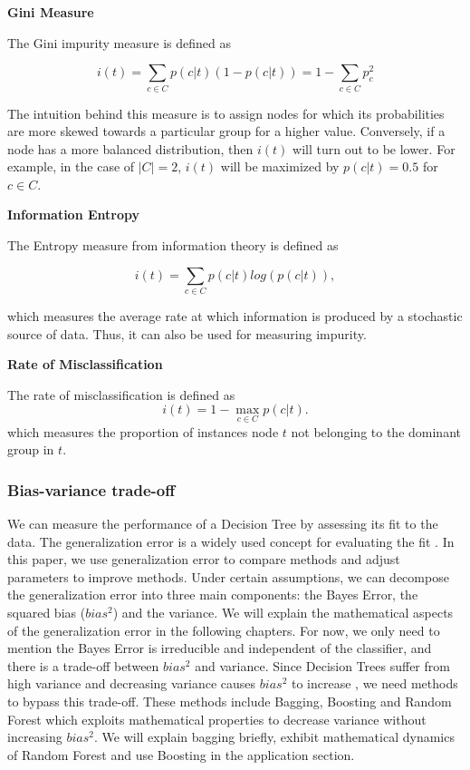 \textbf{Gini Measure}

The Gini impurity measure is defined as 

\begin{equation}
    i(t) = \sum_{c \in C} p(c|t) (1 - p(c|t)) = 1 - \sum_{c \in C} p_{c}^{2}
\end{equation}

The intuition behind this measure is to assign nodes 
for which its probabilities are more skewed towards a particular group for a higher value.
Conversely, if a node has a more balanced distribution, then \(i(t)\) will turn out to be lower.
For example, in the case of \( |C|=2 \), \(i(t)\) will be maximized by \( p(c|t) = 0.5 \) for \( c \in C \).


\textbf{Information Entropy}

The Entropy measure from information theory is defined as

\begin{equation}
    i(t) = \sum_{c \in C} p(c|t) log(p(c|t)),
\end{equation}

which measures the average rate at which information is produced by a stochastic source of data.
Thus, it can also be used for measuring impurity.

\textbf{Rate of Misclassification}

The rate of misclassification is defined as 
\begin{equation}
    i(t) = 1 - \max_{c \in C} p(c|t) .
\end{equation}
which measures the proportion of instances node \(t\) not belonging to the dominant group in \(t\).


\subsubsection{Bias-variance trade-off}
We can measure the performance of a Decision Tree by assessing its fit to the data. 
The generalization error is a widely used concept for evaluating the fit \cite{breiman2001random}.
In this paper, we use generalization error to compare methods and adjust parameters to improve methods. 
Under certain assumptions, we can decompose the generalization error into three main components:
the Bayes Error, the squared bias ($bias^2$) and the variance. 
We will explain the mathematical aspects of the generalization error in the following chapters. 
For now, we only need to mention the Bayes Error is irreducible and independent of the classifier, 
and there is a trade-off between $bias^2$ and variance. Since Decision Trees suffer from high variance and 
decreasing variance causes $bias^2$ to increase \cite{geman1992neural}, we need methods to bypass this trade-off. 
These methods include Bagging, Boosting and Random Forest 
which exploits mathematical properties to decrease variance without increasing $bias^2$. 
We will explain bagging briefly, exhibit mathematical dynamics of Random Forest and 
use Boosting in the application section.


